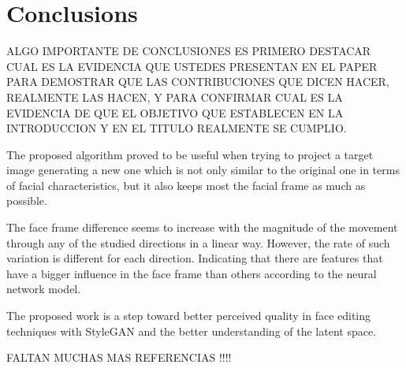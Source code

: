 \documentclass[review]{elsarticle}
\begin{document}
\section{Conclusions}\label{section:conclusions}

ALGO IMPORTANTE DE CONCLUSIONES ES PRIMERO DESTACAR CUAL ES LA EVIDENCIA QUE USTEDES PRESENTAN EN EL PAPER PARA DEMOSTRAR QUE LAS CONTRIBUCIONES QUE DICEN HACER, REALMENTE LAS HACEN, Y PARA CONFIRMAR CUAL ES LA EVIDENCIA DE QUE EL OBJETIVO QUE ESTABLECEN EN LA INTRODUCCION Y EN EL TITULO REALMENTE SE CUMPLIO.

The proposed algorithm proved to be useful when trying to project a target image generating a new one which is not only similar to the original one in terms of facial characteristics, but it also keeps most the facial frame as much as possible.

The face frame difference seems to increase with the magnitude of the movement through any of the studied directions in a linear way. However, the rate of such variation is different for each direction. Indicating that there are features that have a bigger influence in the face frame than others according to the neural network model.

The proposed work is a step toward better perceived quality in face editing techniques with StyleGAN and the better understanding of the latent space.

FALTAN MUCHAS MAS REFERENCIAS !!!!



\end{document}
